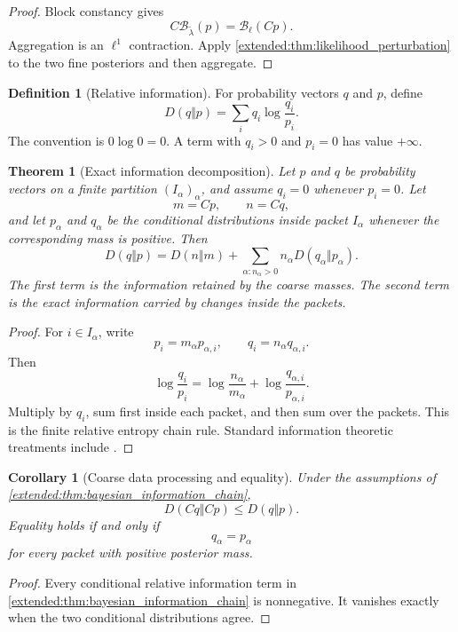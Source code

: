 \documentclass[11pt,letterpaper]{article}
\newtheorem{theorem}{Theorem}[section]
\theoremstyle{plain}
\theoremstyle{plain}
\theoremstyle{plain}
\newtheorem{corollary}[corollary]{Corollary}
\theoremstyle{definition}
\theoremstyle{definition}
\newtheorem{definition}[definition]{Definition}
\theoremstyle{definition}
\theoremstyle{definition}
\theoremstyle{definition}
\theoremstyle{remark}
\theoremstyle{remark}
\theoremstyle{remark}
\theoremstyle{remark}
\theoremstyle{remark}
\theoremstyle{remark}
\newcommand{\Bcal}{\mathcal B}
\let\KomorebiPrimitiveMathcal\mathcal
\renewcommand{\mathcal}[1]{{\KomorebiPrimitiveMathcal{#1}}}
\begin{document}
\begin{proof}
Block constancy gives
\[
C\Bcal_{\widetilde\lambda}(p)
=
\Bcal_\ell(Cp).
\]
Aggregation is an \(\ell^1\) contraction. Apply \cref{extended:thm:likelihood_perturbation} to the two fine posteriors and then aggregate.
\end{proof}

\begin{definition}[Relative information]\label{extended:record:055}
For probability vectors \(q\) and \(p\), define
\[
D(q\Vert p)
=
\sum_iq_i\log\frac{q_i}{p_i}.
\]
The convention is \(0\log0=0\). A term with \(q_i>0\) and \(p_i=0\) has value \(+\infty\).
\end{definition}

\begin{theorem}[Exact information decomposition]\label{extended:record:056}\label{extended:thm:bayesian_information_chain}
Let \(p\) and \(q\) be probability vectors on a finite partition \((I_\alpha)_\alpha\), and assume \(q_i=0\) whenever \(p_i=0\). Let
\[
m=Cp,
\qquad
n=Cq,
\]
and let \(p_\alpha\) and \(q_\alpha\) be the conditional distributions inside packet \(I_\alpha\) whenever the corresponding mass is positive. Then
\[
D(q\Vert p)
=
D(n\Vert m)
+
\sum_{\alpha:n_\alpha>0}
 n_\alpha D(q_\alpha\Vert p_\alpha).
\]
The first term is the information retained by the coarse masses. The second term is the exact information carried by changes inside the packets.
\end{theorem}

\begin{proof}
For \(i\in I_\alpha\), write
\[
p_i=m_\alpha p_{\alpha,i},
\qquad
q_i=n_\alpha q_{\alpha,i}.
\]
Then
\[
\log\frac{q_i}{p_i}
=
\log\frac{n_\alpha}{m_\alpha}
+
\log\frac{q_{\alpha,i}}{p_{\alpha,i}}.
\]
Multiply by \(q_i\), sum first inside each packet, and then sum over the packets. This is the finite relative entropy chain rule. Standard information theoretic treatments include \cite{CoverThomas2006}.
\end{proof}

\begin{corollary}[Coarse data processing and equality]\label{extended:record:057}\label{extended:cor:coarse_data_processing}
Under the assumptions of \cref{extended:thm:bayesian_information_chain},
\[
D(Cq\Vert Cp)
\leq
D(q\Vert p).
\]
Equality holds if and only if
\[
q_\alpha=p_\alpha
\]
for every packet with positive posterior mass.
\end{corollary}

\begin{proof}
Every conditional relative information term in \cref{extended:thm:bayesian_information_chain} is nonnegative. It vanishes exactly when the two conditional distributions agree.
\end{proof}
\end{document}
